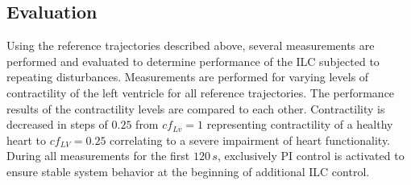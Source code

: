\subsection{Evaluation}
Using the reference trajectories described above, several measurements are performed and evaluated to determine performance of the ILC subjected to repeating disturbances. Measurements are performed for varying levels of contractility of the left ventricle for all reference trajectories. The performance results of the contractility levels are compared to each other. Contractility is decreased in steps of $0.25$ from $cf_{Lv}=1$ representing contractility of a healthy heart to $cf_{LV}=0.25$ correlating to a severe impairment of heart functionality.
\\During all measurements for the first $120\,s$, exclusively PI control is activated to ensure stable system behavior at the beginning of additional ILC control.


